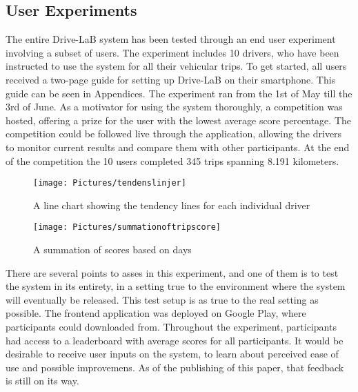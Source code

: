 \subsection{User Experiments}\label{subsec:userexp}

The entire Drive-LaB system has been tested through an end user experiment involving a subset of users. The experiment includes 10 drivers, who have been instructed to use the system for all their vehicular trips. To get started, all users received a two-page guide for setting up Drive-LaB on their smartphone. This guide can be seen in Appendices. The experiment ran from the 1st of May till the 3rd of June. As a motivator for using the system thoroughly, a competition was hosted, offering a prize for the user with the lowest average score percentage. The competition could be followed live through the application, allowing the drivers to monitor current results and compare them with other participants. At the end of the competition the 10 users completed 345 trips spanning 8.191 kilometers.

\begin{figure*}[h]
\begin{minipage}{0.95\textwidth}
\centering
\texttt{[image: Pictures/tendenslinjer]}
\caption{A line chart showing the tendency lines for each individual driver}
\label{fig:tendencylines}
\end{minipage}
\end{figure*}
\begin{figure*}[h]
\begin{minipage}{0.95\textwidth}
\centering
\texttt{[image: Pictures/summationoftripscore]}
\caption{A summation of scores based on days}
\label{fig:summationoftripscore}
\end{minipage}
\end{figure*}

There are several points to asses in this experiment, and one of them is to test the system in its entirety, in a setting true to the environment where the system will eventually be released. This test setup is as true to the real setting as possible. The frontend application was deployed on Google Play, where participants could downloaded from. Throughout the experiment, participants had access to a leaderboard with average scores for all participants. 
It would be desirable to receive user inputs on the system, to learn about perceived ease of use and possible improvemens. As of the publishing of this paper, that feedback is still on its way.


